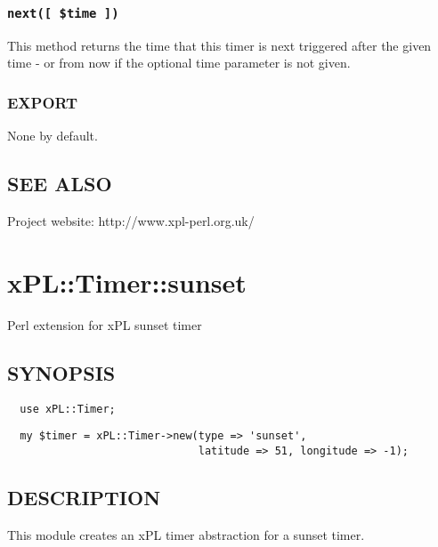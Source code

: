 \subsubsection*{\texttt{next([ \$time ])}\label{xPL::Timer::sunrise_next_time_}}


This method returns the time that this timer is next triggered after
the given time - or from now if the optional time parameter is not
given.

\subsubsection*{EXPORT\label{xPL::Timer::sunrise_EXPORT}}


None by default.

\subsection*{SEE ALSO\label{xPL::Timer::sunrise_SEE_ALSO}}


Project website: http://www.xpl-perl.org.uk/

\section{xPL::Timer::sunset\label{xPL::Timer::sunset}}


Perl extension for xPL sunset timer

\subsection*{SYNOPSIS\label{xPL::Timer::sunset_SYNOPSIS}}
\begin{verbatim}
  use xPL::Timer;
\end{verbatim}
\begin{verbatim}
  my $timer = xPL::Timer->new(type => 'sunset',
                              latitude => 51, longitude => -1);
\end{verbatim}
\subsection*{DESCRIPTION\label{xPL::Timer::sunset_DESCRIPTION}}


This module creates an xPL timer abstraction for a sunset timer.

